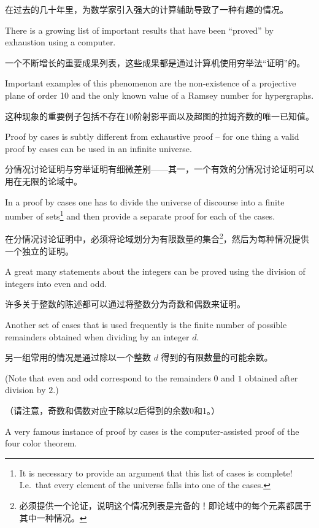 在过去的几十年里，为数学家引入强大的计算辅助导致了一种有趣的情况。

There
is a growing list of important results that have been ``proved'' by
exhaustion using a computer.

一个不断增长的重要成果列表，这些成果都是通过计算机使用穷举法“证明”的。

Important examples of this phenomenon
are the non-existence of a 
projective plane of order 10\cite{lam} and the 
only known value of a 
Ramsey number for hypergraphs\cite{radz}.

这种现象的重要例子包括不存在10阶射影平面\cite{lam}以及超图的拉姆齐数的唯一已知值\cite{radz}。

Proof by cases is subtly different from exhaustive proof -- for one 
thing a valid proof by cases can be used in an infinite universe.

分情况讨论证明与穷举证明有细微差别——其一，一个有效的分情况讨论证明可以用在无限的论域中。

In a proof by cases one has to divide the universe of discourse into
a finite number of sets\footnote{It is necessary to provide an argument that 
this list of cases is complete!
I.e.\ that every element of the universe
falls into one of the cases.} and then provide a separate proof for each
of the cases.

在分情况讨论证明中，必须将论域划分为有限数量的集合\footnote{必须提供一个论证，说明这个情况列表是完备的！即论域中的每个元素都属于其中一种情况。}，然后为每种情况提供一个独立的证明。

A great many statements about the integers can be proved
using the division of integers into even and odd.

许多关于整数的陈述都可以通过将整数分为奇数和偶数来证明。

Another set of 
cases that is used frequently is the finite number of possible remainders
obtained when dividing by an integer $d$.

另一组常用的情况是通过除以一个整数 $d$ 得到的有限数量的可能余数。

(Note that even and odd correspond
to the remainders $0$ and $1$ obtained after division by $2$.)    
  
（请注意，奇数和偶数对应于除以2后得到的余数0和1。）

A very famous instance of proof by cases is the computer-assisted proof
of the 
four color theorem.

